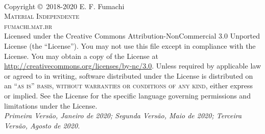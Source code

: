 \newpage
~\vfill
\thispagestyle{empty}

\noindent Copyright \copyright\ 2018-2020 E. F. Fumachi\\ %

\noindent \textsc{Material Independente}\\ %

\noindent \textsc{fumachi.mat.br}\\ %

\noindent Licensed under the Creative Commons Attribution-NonCommercial 3.0 Unported License (the ``License''). You may not use this file except in compliance with the License. You may obtain a copy of the License at \url{http://creativecommons.org/licenses/by-nc/3.0}. Unless required by applicable law or agreed to in writing, software distributed under the License is distributed on an \textsc{``as is'' basis, without warranties or conditions of any kind}, either express or implied. See the License for the specific language governing permissions and limitations under the License.\\ %

\noindent \textit{Primeira Versão, Janeiro de 2020; Segunda Versão, Maio de 2020; Terceira Versão, Agosto de 2020.} %
